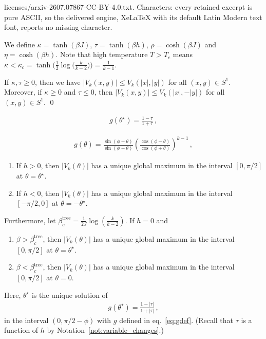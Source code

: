 \documentclass[10pt,a4paper]{amsart}
\begin{document}
licenses/arxiv-2607.07867-CC-BY-4.0.txt. Characters: every retained excerpt is pure ASCII, so the delivered engine, XeLaTeX with its default Latin Modern text font, reports no missing character.
\begin{notation}
\label{not:variable_changes}
We define $\kappa = \tanh(\beta J)$, $\tau = \tanh(\beta h)$, $\rho = \cosh(\beta J)$ and $\eta = \cosh(\beta h)$. Note that high temperature $T > T_c$ means $\kappa < \kappa_c = \tanh\big(\tfrac{1}{2} \log \big(\tfrac{k}{k-2}\big)\big) = \tfrac{1}{k-1}$.
\end{notation}

\begin{lemma}
\label{lmm:positiveVk}
If $\kappa, \tau \geq 0$, then we have $|V_k(x,y)| \leq V_k(|x|, |y|)$ for all $(x,y) \in S^1$.
Moreover, if $\kappa \geq 0$ and $\tau \leq 0$, then $|V_k(x,y)|  \leq V_k(|x|,-|y|)$ for all $(x,y) \in S^1$. \qed
\end{lemma}

\begin{align}
  \label{eq:crit}
  g(\theta^\star) = \frac{1-\tau}{1+\tau}\, ,
\end{align}

\begin{align}
  \label{eq:gdef}
  g(\theta) = \frac{\sin(\phi-\theta)}{\sin(\phi+\theta)} \left( \frac{\cos(\phi-\theta)}{\cos(\phi+\theta)} \right)^{k-1}\,,
\end{align}

\begin{lemma}\mbox{}
  \label{lem:maximum}
  \begin{enumerate}
    \item If $h > 0$, then $|V_k(\theta)|$ has a unique global maximum in the interval $[0,\pi/2]$ at $\theta= \theta^\star$.
    \item If $h < 0$, then $|V_k(\theta)|$ has a unique global maximum in the interval $[-\pi/2,0]$ at $\theta=-\theta^\star$.
  \end{enumerate}

  Furthermore, let $\beta_c^{\mathrm{tree}} = \frac{1}{2J}\log(\frac{k}{k-2})$.  If $h =0$ and
  \begin{enumerate}
    \item[3.] $\beta > \beta_c^{\mathrm{tree}}$, then $|V_k(\theta)|$ has a unique global maximum in the interval $[0,\pi/2]$ at $\theta = \theta^\star$.
    \item[4.] $\beta < \beta_c^{\mathrm{tree}}$, then $|V_k(\theta)|$ has a unique global maximum in the interval $[0,\pi/2]$ at $\theta = 0$.
  \end{enumerate}

  Here, $\theta^\star$ is the unique solution of 
  \begin{align}
    g(\theta^\star) = \frac{1-|\tau|}{1+|\tau|}\, ,
  \end{align}
  in the interval $(0,\pi/2-\phi)$ with $g$ defined in eq.~\eqref{eq:gdef}.
  (Recall that $\tau$ is a function of $h$ by Notation~\ref{not:variable_changes}.)
\end{lemma}
\end{document}
